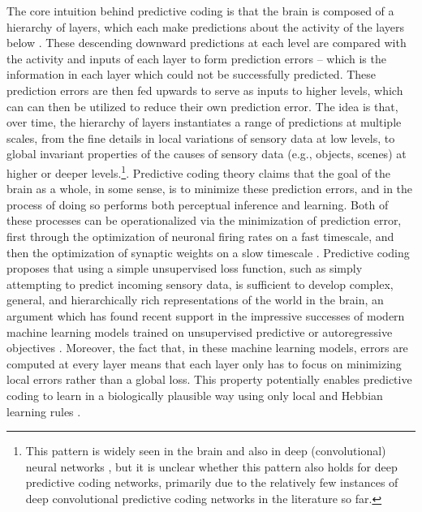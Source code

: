 The core intuition behind predictive coding is that the brain is composed of a hierarchy of layers, which each make predictions about the activity of the layers below \citep{clark2015surfing,friston2008hierarchical}. These descending downward predictions at each level are compared with the activity and inputs of each layer to form prediction errors -- which is the information in each layer which could not be successfully predicted. These prediction errors are then fed upwards to serve as inputs to higher levels, which can can then be utilized to reduce their own prediction error. The idea is that, over time, the hierarchy of layers instantiates a range of predictions at multiple scales, from the fine details in local variations of sensory data at low levels, to global invariant properties of the causes of sensory data (e.g., objects, scenes) at higher or deeper levels.\footnote{This pattern is widely seen in the brain \citep{hubel1962receptive,grill2004human} and also in deep (convolutional) neural networks \citep{olah2017feature}, but it is unclear whether this pattern also holds for deep predictive coding networks, primarily due to the relatively few instances of deep convolutional predictive coding networks in the literature so far.}. Predictive coding theory claims that the goal of the brain as a whole, in some sense, is to minimize these prediction errors, and in the process of doing so performs both perceptual inference and learning. Both of these processes can be operationalized via the minimization of prediction error, first through the optimization of neuronal firing rates on a fast timescale, and then the optimization of synaptic weights on a slow timescale \citep{friston2008hierarchical}. Predictive coding proposes that using a simple unsupervised loss function, such as simply attempting to predict incoming sensory data, is sufficient to develop complex, general, and hierarchically rich representations of the world in the brain, an argument which has found recent support in the impressive successes of modern machine learning models trained on unsupervised predictive or autoregressive objectives \citep{radford2019language,kaplan2020scaling,brown2020language}. Moreover, the fact that, in these machine learning models, errors are computed at every layer means that each layer only has to focus on minimizing local errors rather than a global loss. This property potentially enables predictive coding to learn in a biologically plausible way using only local and Hebbian learning rules \citep{whittington2017approximation,millidge2020predictive,friston2003learning}.

